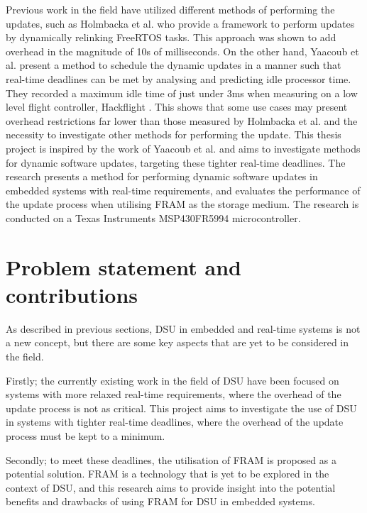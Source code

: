 Previous work in the field have utilized different methods of performing the updates, such as Holmbacka et al. \cite{dynUpdateFramework} who provide a framework to perform updates by dynamically relinking FreeRTOS tasks. This approach was shown to add overhead in the magnitude of 10s of milliseconds. On the other hand, Yaacoub et al. \cite{NeRTA} present a method to schedule the dynamic updates in a manner such that real-time deadlines can be met by analysing and predicting idle processor time. They recorded a maximum idle time of just under 3ms when measuring on a low level flight controller, Hackflight \cite{hackflight}. This shows that some use cases may present overhead restrictions far lower than those measured by Holmbacka et al. and the necessity to investigate other methods for performing the update. This thesis project is inspired by the work of Yaacoub et al. and aims to investigate methods for dynamic software updates, targeting these tighter real-time deadlines. The research presents a method for performing dynamic software updates in embedded systems with real-time requirements, and evaluates the performance of the update process when utilising FRAM as the storage medium. The research is conducted on a Texas Instruments MSP430FR5994 microcontroller.

\section{Problem statement and contributions}
As described in previous sections, DSU in embedded and real-time systems is not a new concept, but there are some key aspects that are yet to be considered in the field. 

Firstly; the currently existing work in the field of DSU have been focused on systems with more relaxed real-time requirements, where the overhead of the update process is not as critical. This project aims to investigate the use of DSU in systems with tighter real-time deadlines, where the overhead of the update process must be kept to a minimum.

Secondly; to meet these deadlines, the utilisation of FRAM is proposed as a potential solution. FRAM is a technology that is yet to be explored in the context of DSU, and this research aims to provide insight into the potential benefits and drawbacks of using FRAM for DSU in embedded systems.

